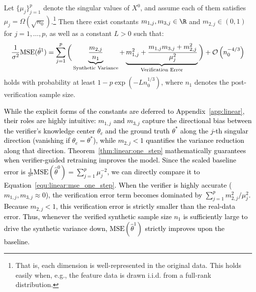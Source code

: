 \begin{theorem}\label{thm:linear:one_step}
Let $\{\mu_j\}_{j=1}^p$ denote the singular values of $X^0$, 
and assume each of them satisfies $\mu_j = \Omega(\sqrt{n_0})$.\footnote{That is, each dimension is well-represented in the original data. This holds easily when, e.g., the feature data is drawn i.i.d. from a full-rank distribution.}
Then there exist constants $m_{1,j},m_{3,j} \in \R$ and $m_{2,j}\in (0,1)$ for $j=1, \ldots, p$,  as well as a constant $L>0$ such that:
\begin{equation}
    \frac{1}{\sigma^2}\text{MSE}(\hat{\theta}^1) = \sum_{j=1}^{p} \bigg( \underbrace{\frac{m_{2,j}}{n_1}}_{\text{\scriptsize Synthetic Variance}} + \underbrace{m^2_{1,j}+\frac{m_{1,j}m_{3,j}+m^2_{2,j}}{\mu^2_j}}_{\text{\scriptsize Verification Error}} \bigg) + \mathcal{O}\left( n^{-4/3}_0 \right)\label{equ:linear:mse_one_step}
\end{equation}
holds with probability at least \( 1 - p\exp\left(-Ln_0^{1/3}\right) \), where \( n_1 \) denotes the post-verification sample size.
 
\end{theorem}

\textcolor{black}{While the explicit forms of the constants are deferred to Appendix~\ref{app:linear}, their roles are highly intuitive: $m_{1,j}$ and $m_{3,j}$ capture the directional bias between the verifier's knowledge center $\theta_c$ and the ground truth $\theta^*$ along the $j$-th singular direction (vanishing if $\theta_c = \theta^*$), while $m_{2,j} < 1$  quantifies the variance reduction along that direction.
Theorem~\ref{thm:linear:one_step} mathematically guarantees when verifier-guided retraining improves the model.
Since the scaled baseline error is $\frac{1}{\sigma^2}\text{MSE}(\hat{\theta}^0) = \sum_{j=1}^p \mu_j^{-2}$, we can directly compare it to Equation~\ref{equ:linear:mse_one_step}.
When the verifier is highly accurate ($m_{1,j}, m_{3,j} \approx 0$), the verification error term becomes dominated by $\sum_{j=1}^p m_{2,j}^2 / \mu_j^2$. 
Because $m_{2,j} < 1$, this verification error is strictly smaller than the real-data error.
Thus, whenever the verified synthetic sample size $n_1$ is sufficiently large to drive the synthetic variance down, $\text{MSE}(\hat{\theta}^1)$ strictly improves upon the baseline.
}




